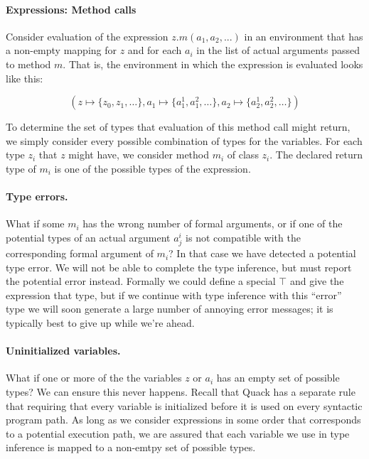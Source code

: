 \documentclass[11pt]{article}
\begin{document}
\paragraph{Expressions: Method calls}

Consider evaluation of the expression \( z.m(a_1, a_2, ... )\) in an
environment that has a non-empty mapping for $z$ and for each $a_i$ in
the list of actual arguments passed to method $m$.  That is, the
environment in which the expression is evaluated looks like this: 

\[ ( z \mapsto \{ z_0, z_1, \ldots \}, 
     a_1 \mapsto \{ a^1_1, a^2_1, \ldots \}, 
     a_2 \mapsto \{ a^1_2, a^2_2, \ldots \} ) \]

To determine the set of types that evaluation of this method call
might return, we simply consider every possible combination of types
for the variables. For each type \(z_i\) that \(z\) might have, we 
consider method \(m_i\) of class \(z_i\).   The declared return type
of \( m_i\) is one of the possible types of the expression.

\paragraph{Type errors.}
What if some \(m_i\) has the wrong number of formal arguments, or if
one of the potential types of an actual argument \(a^i_j\) is not
compatible with the corresponding formal argument of \(m_i\)?  In that
case we have detected a potential type error.  We will not be able to
complete the type inference, but must report the potential error
instead.  Formally we could define a special \( \top \) and give the
expression that type, but if we continue with type inference with this
``error'' type we will soon generate a large number of annoying error
messages; it is typically best to give up while we're ahead. 

\paragraph{Uninitialized variables.}
What if one or more of the the variables $z$ or $a_i$ has an empty set
of possible types?  We can ensure this never happens.  Recall that
Quack has a separate rule that requiring that every variable is
initialized before it is used  on every syntactic program path.  As
long as we consider expressions in some order that corresponds to a
potential execution path, we are assured that each variable we use in
type inference is mapped to a non-emtpy set of possible types. 
\end{document}
